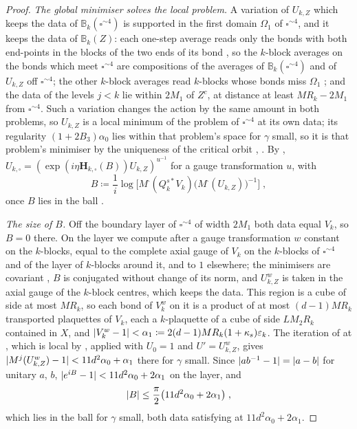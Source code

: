 \documentclass[11pt]{preprint}
\DeclarePairedDelimiter{\abs}{\lvert}{\rvert}
\numberwithin{equation}{section}
\theoremstyle{definition}
\theoremstyle{remark}
\theoremstyle{plain}
\begin{document}
\begin{proof}
\emph{The global minimiser solves the local problem.} A variation of $U_{k,Z}$ which keeps the data of $\mathbb B_k(\square^{\sim4})$ is supported in the first domain $\Omega_1$ of $\square^{\sim4}$, and it keeps the data of $\mathbb B_k(Z)$: each one-step average reads only the bonds with both end-points in the blocks of the two ends of its bond \cite[(0.4), p.~253]{BalabanRG1}, so the $k$-block averages on the bonds which meet $\square^{\sim4}$ are compositions of the averages of $\mathbb B_k(\square^{\sim4})$ and of $U_{k,Z}$ off $\square^{\sim4}$; the other $k$-block averages read $k$-blocks whose bonds miss $\Omega_1$ \cite[p.~256]{BalabanCRE}; and the data of the levels $j < k$ lie within $2M_1$ of $Z^c$, at distance at least $MR_k - 2M_1$ from $\square^{\sim4}$. Such a variation changes the action by the same amount in both problems, so $U_{k,Z}$ is a local minimum of the problem of $\square^{\sim4}$ at its own data; its regularity $(1 + 2B_3)\alpha_0$ lies within that problem's space for $\gamma$ small, so it is that problem's minimiser by the uniqueness of the critical orbit \cite[Theorem~1, p.~279]{BalabanVAR}, \cite[p.~256]{BalabanCRE}. By \cite[Proposition~9, p.~309]{BalabanVAR}, $U_{k,\square} = (\exp(i\eta\mathbf H_{k,\square}(B))U_{k,Z})^{u^{-1}}$ for a gauge transformation $u$, with
\begin{equation}\label{eq:first-class-B}
    B \coloneqq \frac1i\log\bigl[M^\cdot(Q_k^{s*}V_k)\bigl(M^\cdot(U_{k,Z})\bigr)^{-1}\bigr]\;,
\end{equation}
once $B$ lies in the ball \cite[(172)]{BalabanVAR}.

\emph{The size of $B$.} Off the boundary layer of $\square^{\sim4}$ of width $2M_1$ both data equal $V_k$, so $B = 0$ there. On the layer we compute after a gauge transformation $w$ constant on the $k$-blocks, equal to the complete axial gauge of $V_k$ on the $k$-blocks of $\square^{\sim4}$ and of the layer of $k$-blocks around it, and to $1$ elsewhere; the minimisers are covariant \cite[(11), p.~19]{BalabanAVG}, $B$ is conjugated without change of its norm, and $U^w_{k,Z}$ is taken in the axial gauge \cite[(1.15), p.~78]{BalabanREG} of the $k$-block centres, which keeps the data. This region is a cube of side at most $MR_k$, so each bond of $V^w_k$ on it is a product of at most $(d - 1)MR_k$ transported plaquettes of $V_k$, each a $k$-plaquette of a cube of side $LM_2R_k$ contained in $X$, and $\abs{V^w_k - 1} < \alpha_1 \coloneqq 2(d - 1)MR_k(1 + \kappa_s)\varepsilon_k$. The iteration of \cite[Lemma~1]{BalabanREG} at \cite[p.~87, ll.~35--39]{BalabanREG}, which is local by \cite[p.~80]{BalabanREG}, applied with $U_0 = 1$ and $U' = U^w_{k,Z}$, gives $\abs{M^j(U^w_{k,Z}) - 1} < 11d^2\alpha_0 + \alpha_1$ there for $\gamma$ small. Since $\abs{ab^{-1} - 1} = \abs{a - b}$ for unitary $a$, $b$, $\abs{e^{iB} - 1} < 11d^2\alpha_0 + 2\alpha_1$ on the layer, and
\begin{equation}\label{eq:first-class-B-bound}
    \abs B \leq \frac\pi2\bigl(11d^2\alpha_0 + 2\alpha_1\bigr)\;,
\end{equation}
which lies in the ball \cite[(172)]{BalabanVAR} for $\gamma$ small, both data satisfying \cite[(7)]{BalabanVAR} at $11d^2\alpha_0 + 2\alpha_1$.


\end{proof}
\end{document}
